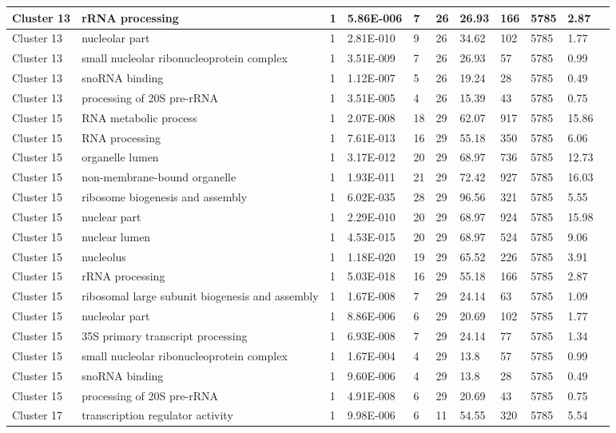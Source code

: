 \begin{tabular}{|l|l|l|l|l|l|l|l|l|l|l|}
\hline
Cluster 13&rRNA processing&1&5.86E-006&7&26&26.93&166&5785&2.87&\\
\hline
Cluster 13&nucleolar part&1&2.81E-010&9&26&34.62&102&5785&1.77&\\
\hline
Cluster 13&small nucleolar ribonucleoprotein complex&1&3.51E-009&7&26&26.93&57&5785&0.99&\\
\hline
Cluster 13&snoRNA binding&1&1.12E-007&5&26&19.24&28&5785&0.49&\\
\hline
Cluster 13&processing of 20S pre-rRNA&1&3.51E-005&4&26&15.39&43&5785&0.75&\\
\hline
Cluster 15&RNA metabolic process&1&2.07E-008&18&29&62.07&917&5785&15.86&\\
\hline
Cluster 15&RNA processing&1&7.61E-013&16&29&55.18&350&5785&6.06&\\
\hline
Cluster 15&organelle lumen&1&3.17E-012&20&29&68.97&736&5785&12.73&\\
\hline
Cluster 15&non-membrane-bound organelle&1&1.93E-011&21&29&72.42&927&5785&16.03&\\
\hline
Cluster 15&ribosome biogenesis and assembly&1&6.02E-035&28&29&96.56&321&5785&5.55&\\
\hline
Cluster 15&nuclear part&1&2.29E-010&20&29&68.97&924&5785&15.98&\\
\hline
Cluster 15&nuclear lumen&1&4.53E-015&20&29&68.97&524&5785&9.06&\\
\hline
Cluster 15&nucleolus&1&1.18E-020&19&29&65.52&226&5785&3.91&\\
\hline
Cluster 15&rRNA processing&1&5.03E-018&16&29&55.18&166&5785&2.87&\\
\hline
Cluster 15&ribosomal large subunit biogenesis and assembly&1&1.67E-008&7&29&24.14&63&5785&1.09&\\
\hline
Cluster 15&nucleolar part&1&8.86E-006&6&29&20.69&102&5785&1.77&\\
\hline
Cluster 15&35S primary transcript processing&1&6.93E-008&7&29&24.14&77&5785&1.34&\\
\hline
Cluster 15&small nucleolar ribonucleoprotein complex&1&1.67E-004&4&29&13.8&57&5785&0.99&\\
\hline
Cluster 15&snoRNA binding&1&9.60E-006&4&29&13.8&28&5785&0.49&\\
\hline
Cluster 15&processing of 20S pre-rRNA&1&4.91E-008&6&29&20.69&43&5785&0.75&\\
\hline
Cluster 17&transcription regulator activity&1&9.98E-006&6&11&54.55&320&5785&5.54&\\

\end{tabular}
